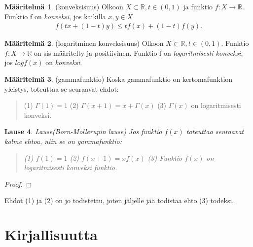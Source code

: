 \documentclass[12pt]{article}
\theoremstyle{definition}
\newtheorem{maar}{Määritelmä}
\theoremstyle{plain}
\newtheorem{lause}[maar]{Lause}
\begin{document}
\begin{maar}
(konveksisuus)
Olkoon $X \subset \mathbb{R}, t \in (0, 1)$ ja funktio $f: X \rightarrow \mathbb{R}$. Funktio f on \emph{konveksi}, jos kaikilla $x,y \in X$
\begin{align*}
    f(tx+(1-t)y) \le tf(x)+(1-t)f(y).
\end{align*}
\end{maar}


\begin{maar}
(logaritminen konveksisuus)
Olkoon $X \subset \mathbb{R}, t \in (0, 1)$. Funktio $f: X \rightarrow \mathbb{R}$ on sis määritelty ja positiivinen. Funktio f on \emph{logaritmisesti konveksi}, jos $logf(x)$ on \emph{konveksi}.
\end{maar}


\begin{maar}
(gammafunktio)
Koska gammafunktio on kertomafunktion yleistys, toteuttaa se seuraavat ehdot:
\begin{quote}
    (1) $\Gamma(1)=1$ \newline
    (2) $\Gamma(x+1)=x+\Gamma(x)$ \newline
    (3) $\Gamma(x)$ on logaritmisesti konveksi.
\end{quote}
\end{maar}

\begin{lause}
Lause(Born-Mollerupin lause)
\newline
Jos funktio $f(x)$ toteuttaa seuraavat kolme ehtoa, niin se on gammafunktio:
\begin{quote}
(1) $f(1)=1$ \newline
(2) $f(x+1)=xf(x)$ \newline
(3) Funktio $f(x)$ on logaritmisesti konveksi funktio.
\end{quote}
\end{lause}

\begin{proof}

\end{proof}
\newline
Ehdot (1) ja (2) on jo todistettu, joten jäljelle jää todistaa ehto (3) todeksi. 

\newpage
\section{Kirjallisuutta}
\onehalfspacing
[1] 
\newline
[2]
\newline
[3]
\newline
[4]
\end{document}
